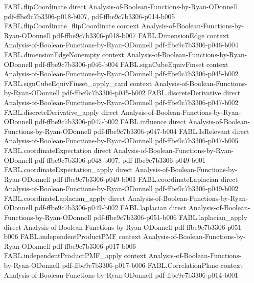\begin{theorem}
\proofstep
  {FABL.flipCoordinate}
  {direct}
  {Analysis-of-Boolean-Functions-by-Ryan-ODonnell}
  {pdf-ffbe9c7b3306-p018-b007,
    pdf-ffbe9c7b3306-p014-b005}
\proofstep
  {FABL.flipCoordinate_flipCoordinate}
  {context}
  {Analysis-of-Boolean-Functions-by-Ryan-ODonnell}
  {pdf-ffbe9c7b3306-p018-b007}
\proofstep
  {FABL.DimensionEdge}
  {context}
  {Analysis-of-Boolean-Functions-by-Ryan-ODonnell}
  {pdf-ffbe9c7b3306-p046-b004}
\proofstep
  {FABL.dimensionEdgeNonempty}
  {context}
  {Analysis-of-Boolean-Functions-by-Ryan-ODonnell}
  {pdf-ffbe9c7b3306-p046-b004}
\proofstep
  {FABL.signCubeEquivFinset}
  {context}
  {Analysis-of-Boolean-Functions-by-Ryan-ODonnell}
  {pdf-ffbe9c7b3306-p045-b002}
\proofstep
  {FABL.signCubeEquivFinset_apply_card}
  {context}
  {Analysis-of-Boolean-Functions-by-Ryan-ODonnell}
  {pdf-ffbe9c7b3306-p045-b002}
\proofstep
  {FABL.discreteDerivative}
  {direct}
  {Analysis-of-Boolean-Functions-by-Ryan-ODonnell}
  {pdf-ffbe9c7b3306-p047-b002}
\proofstep
  {FABL.discreteDerivative_apply}
  {direct}
  {Analysis-of-Boolean-Functions-by-Ryan-ODonnell}
  {pdf-ffbe9c7b3306-p047-b002}
\proofstep
  {FABL.influence}
  {direct}
  {Analysis-of-Boolean-Functions-by-Ryan-ODonnell}
  {pdf-ffbe9c7b3306-p047-b004}
\proofstep
  {FABL.IsRelevant}
  {direct}
  {Analysis-of-Boolean-Functions-by-Ryan-ODonnell}
  {pdf-ffbe9c7b3306-p047-b005}
\proofstep
  {FABL.coordinateExpectation}
  {direct}
  {Analysis-of-Boolean-Functions-by-Ryan-ODonnell}
  {pdf-ffbe9c7b3306-p048-b007,
    pdf-ffbe9c7b3306-p049-b001}
\proofstep
  {FABL.coordinateExpectation_apply}
  {direct}
  {Analysis-of-Boolean-Functions-by-Ryan-ODonnell}
  {pdf-ffbe9c7b3306-p049-b001}
\proofstep
  {FABL.coordinateLaplacian}
  {direct}
  {Analysis-of-Boolean-Functions-by-Ryan-ODonnell}
  {pdf-ffbe9c7b3306-p049-b002}
\proofstep
  {FABL.coordinateLaplacian_apply}
  {direct}
  {Analysis-of-Boolean-Functions-by-Ryan-ODonnell}
  {pdf-ffbe9c7b3306-p049-b002}
\proofstep
  {FABL.laplacian}
  {direct}
  {Analysis-of-Boolean-Functions-by-Ryan-ODonnell}
  {pdf-ffbe9c7b3306-p051-b006}
\proofstep
  {FABL.laplacian_apply}
  {direct}
  {Analysis-of-Boolean-Functions-by-Ryan-ODonnell}
  {pdf-ffbe9c7b3306-p051-b006}
\proofstep
  {FABL.independentProductPMF}
  {context}
  {Analysis-of-Boolean-Functions-by-Ryan-ODonnell}
  {pdf-ffbe9c7b3306-p017-b006}
\proofstep
  {FABL.independentProductPMF_apply}
  {context}
  {Analysis-of-Boolean-Functions-by-Ryan-ODonnell}
  {pdf-ffbe9c7b3306-p017-b006}
\proofstep
  {FABL.CorrelationPlane}
  {context}
  {Analysis-of-Boolean-Functions-by-Ryan-ODonnell}
  {pdf-ffbe9c7b3306-p014-b001}

\end{theorem}

